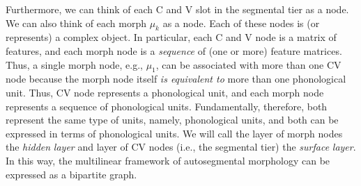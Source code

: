 
Furthermore, we can think of each C and V slot in the segmental tier as a node.
We can also think of each morph $\mu_k$ as a node. 
 Each of these nodes is (or represents) a complex object. In particular, each C and V node
 is a matrix of features, and each morph node is a \emph{sequence} of (one or more) feature matrices. Thus, a single morph node, e.g., $\mu_1$, can be associated with more than one CV node because the morph node itself \emph{is equivalent to} more than one phonological unit.  
Thus, CV node represents a phonological unit, and each morph node represents a sequence of phonological units.
Fundamentally, therefore, both represent the same type of units, namely, phonological units, and both can be expressed in terms of phonological units.
We will call the layer of  morph nodes the \emph{hidden} \emph{layer} and layer of CV nodes (i.e., the segmental tier) the \emph{surface} \emph{layer}. 
In this way, the multilinear framework of autosegmental morphology can be expressed as a bipartite graph.


